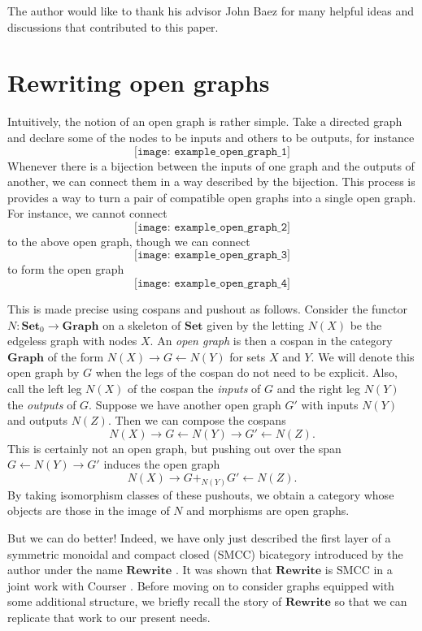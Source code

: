 \documentclass[11pt]{amsart}
\newcommand{\cat}[1]{\mathbf{#1}}
\newcommand{\from}{\colon}
\theoremstyle{remark}
\theoremstyle{definition}
\begin{document}
The author would like to thank his advisor John Baez for many helpful ideas and discussions that contributed to this paper.   

\section{Rewriting open graphs}
\label{sec:RewritingOpenGraphs}

Intuitively, the notion of an open graph is rather simple.  Take a directed graph and declare some of the nodes to be inputs and others to be outputs, for instance
\[
\texttt{[image: example\_open\_graph\_1]}
\]
Whenever there is a bijection between the inputs of one graph and the outputs of another, we can connect them in a way described by the bijection.  This process is provides a way to turn a pair of compatible open graphs into a single open graph.  For instance, we cannot connect 
\[
\texttt{[image: example\_open\_graph\_2]}
\]
to the above open graph, though we can connect 
\[
\texttt{[image: example\_open\_graph\_3]}
\]
to form the open graph
\[
\texttt{[image: example\_open\_graph\_4]}
\]

This is made precise using cospans and pushout as follows. Consider the functor $N \from \cat{Set}_0 \to \cat{Graph}$ on a skeleton of $\cat{Set}$ given by the letting $N(X)$ be the edgeless graph with nodes $X$.  An \emph{open graph} is then a cospan in the category $\cat{Graph}$ of the form $N(X) \to G \gets N(Y)$ for sets $X$ and $Y$. We will denote this open graph by $G$ when the legs of the cospan do not need to be explicit.  Also, call the left leg $N(X)$ of the cospan the \emph{inputs} of $G$ and the right leg $N(Y)$ the \emph{outputs} of $G$.  Suppose we have another open graph $G'$ with inputs $N(Y)$ and outputs $N(Z)$.  Then we can compose the cospans 
\[
N(X) \to G \gets N(Y) \to G' \gets N(Z). 
\] 
This is certainly not an open graph, but pushing out over the span $G \gets N(Y) \to G'$ induces the open graph  
\[
N(X) \to G +_{N(Y)} G' \gets N(Z).
\] 
By taking isomorphism classes of these pushouts, we obtain a category whose objects are those in the image of $N$ and morphisms are open graphs. 

But we can do better! Indeed, we have only just described the first layer of a symmetric monoidal and compact closed (SMCC) bicategory introduced by the author under the name $\cat{Rewrite}$ \cite{Cicala_SpansCospans}. It was shown that $\cat{Rewrite}$ is SMCC in a joint work with Courser \cite{CicalaCourser_BicatSpansCospan}. Before moving on to consider graphs equipped with some additional structure, we briefly recall the story of $\cat{Rewrite}$ so that we can replicate that work to our present needs.
\end{document}
